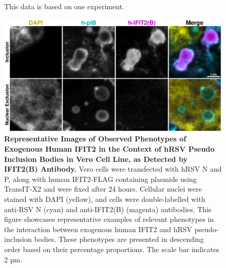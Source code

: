 \begin{figure}
{This data is based on one experiment.}
    \label{fig:Observed Phenotypes of Exogenous Human IFIT2 in the Context of hRSV Pseudo Inclusion Bodies in Vero Cell Line, as Detected by IFIT2(B) Antibody}
\end{figure}

\begin{figure}
    \centering
    \includegraphics[width=1\linewidth]{09. Chapter 4/Figs/01. pIB/03. IFIT2/04. IFIT2-FLAG/02. IFIT2B/03. i2b-hi2f-hnhp.pdf}
    \caption[Representative Images of Observed Phenotypes of Exogenous Human IFIT2 in the Context of hRSV Pseudo Inclusion Bodies in Vero Cell Line, as Detected by IFIT2(B) Antibody.]{\textbf{Representative Images of Observed Phenotypes of Exogenous Human IFIT2 in the Context of hRSV Pseudo Inclusion Bodies in Vero Cell Line, as Detected by IFIT2(B) Antibody.} Vero cells were transfected with hRSV N and P, along with human IFIT2-FLAG containing plasmids using TransIT-X2 and were fixed after 24 hours. Cellular nuclei were stained with DAPI (yellow), and cells were double-labelled with anti-RSV N (cyan) and anti-IFIT2(B) (magenta) antibodies. This figure showcases representative examples of relevant phenotypes in the interaction between exogenous human IFIT2 and hRSV pseudo-inclusion bodies. These phenotypes are presented in descending order based on their percentage proportions. The scale bar indicates 2 µm.}
    \label{fig:Representative Images of Observed Phenotypes of Exogenous Human IFIT2 in the Context of hRSV Pseudo Inclusion Bodies in Vero Cell Line, as Detected by IFIT2(B) Antibody}
\end{figure}

